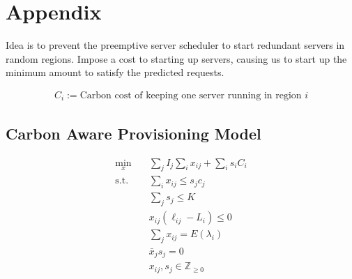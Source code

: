 \section{Appendix}

Idea is to prevent the preemptive server scheduler to start redundant servers in random regions. Impose a cost to starting up servers, causing us to start up the minimum amount to satisfy the predicted requests. 

\begin{equation*}
\begin{aligned}
C_{i}:= \text{Carbon cost of keeping one server running in region $i$}
\end{aligned}
\end{equation*}

\subsection{Carbon Aware Provisioning Model}
\label{sec:capm}

\begin{subequations}
    \begin{align}
    \underset{x}{\min} \quad & \sum_j I_j\sum_i x_{ij} + \sum_i s_i C_i \\
    \text{s.t.}  \quad & \sum_i x_{ij} \leq s_jc_j \\
    & \sum_j s_j \leq K \\
    & x_{ij}\left(\ell_{ij}-L_i\right) \leq 0 \\
    & \sum_j x_{ij} = E(\lambda_i) \\
    & \bar{x}_js_j=0 \\
    & x_{ij},s_j \in\mathbb{Z}_{\geq 0}
    \end{align}
    \label{provEq}
\end{subequations}
